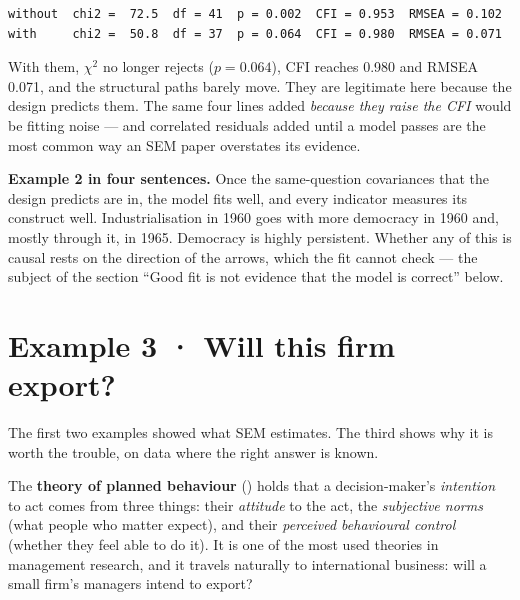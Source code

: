\documentclass[
  letterpaper,
  10pt,
  twoside,
  openright,
  numbers=noenddot,
  chapterprefix=true]{scrbook}
\begin{document}
\begin{verbatim}
without  chi2 =  72.5  df = 41  p = 0.002  CFI = 0.953  RMSEA = 0.102
with     chi2 =  50.8  df = 37  p = 0.064  CFI = 0.980  RMSEA = 0.071
\end{verbatim}

With them, \(\chi^2\) no longer rejects (\(p = 0.064\)), CFI reaches
0.980 and RMSEA 0.071, and the structural paths barely move. They are
legitimate here because the design predicts them. The same four lines
added \emph{because they raise the CFI} would be fitting noise --- and
correlated residuals added until a model passes are the most common way
an SEM paper overstates its evidence.

\textbf{Example 2 in four sentences.} Once the same-question covariances
that the design predicts are in, the model fits well, and every
indicator measures its construct well. Industrialisation in 1960 goes
with more democracy in 1960 and, mostly through it, in 1965. Democracy
is highly persistent. Whether any of this is causal rests on the
direction of the arrows, which the fit cannot check --- the subject of
the section ``Good fit is not evidence that the model is correct''
below.

\section{Example 3 · Will this firm
export?}\label{example-3-will-this-firm-export}

The first two examples showed what SEM estimates. The third shows why it
is worth the trouble, on data where the right answer is known.

The \textbf{theory of planned behaviour} () holds that a decision-maker's \emph{intention} to act comes from
three things: their \emph{attitude} to the act, the \emph{subjective
norms} (what people who matter expect), and their \emph{perceived
behavioural control} (whether they feel able to do it). It is one of the
most used theories in management research, and it travels naturally to
international business: will a small firm's managers intend to export?
\end{document}
